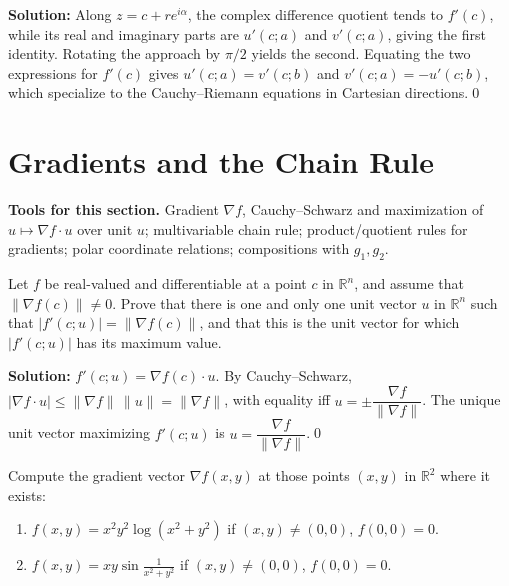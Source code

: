\noindent\textbf{Solution:}
Along $z=c+re^{i\alpha}$, the complex difference quotient tends to $f'(c)$, while its real and imaginary parts are $u'(c;a)$ and $v'(c;a)$, giving the first identity. Rotating the approach by $\pi/2$ yields the second. Equating the two expressions for $f'(c)$ gives $u'(c;a)=v'(c;b)$ and $v'(c;a)=-u'(c;b)$, which specialize to the Cauchy–Riemann equations in Cartesian directions.\qed
\section{Gradients and the Chain Rule}

\noindent\textbf{Tools for this section.} Gradient $\nabla f$, Cauchy–Schwarz and maximization of $u\mapsto \nabla f\cdot u$ over unit $u$; multivariable chain rule; product/quotient rules for gradients; polar coordinate relations; compositions with $g_1,g_2$.



\begin{problembox}
Let \( f \) be real-valued and differentiable at a point \( c \) in \( \mathbb{R}^n \), and assume that \( \| \nabla f(c) \| \neq 0 \). Prove that there is one and only one unit vector \( u \) in \( \mathbb{R}^n \) such that \( |f'(c; u)| = \| \nabla f(c) \| \), and that this is the unit vector for which \( |f'(c; u)| \) has its maximum value.
\end{problembox}

\noindent\textbf{Solution:}
$f'(c;u)=\nabla f(c)\cdot u$. By Cauchy–Schwarz, $|\nabla f\cdot u|\le\|\nabla f\|\,\|u\|=\|\nabla f\|$, with equality iff $u=\pm\dfrac{\nabla f}{\|\nabla f\|}$. The unique unit vector maximizing $f'(c;u)$ is $u=\dfrac{\nabla f}{\|\nabla f\|}$.\qed


\begin{problembox}
Compute the gradient vector \( \nabla f(x, y) \) at those points \( (x, y) \) in \( \mathbb{R}^2 \) where it exists:
\begin{enumerate}[label=(\alph*)]
\item \( f(x, y) = x^2 y^2 \log (x^2 + y^2) \) if \( (x, y) \ne (0, 0) \), \( f(0, 0) = 0 \).
\item \( f(x, y) = xy \sin \frac{1}{x^2 + y^2} \) if \( (x, y) \ne (0, 0) \), \( f(0, 0) = 0 \).
\end{enumerate}
\end{problembox}

